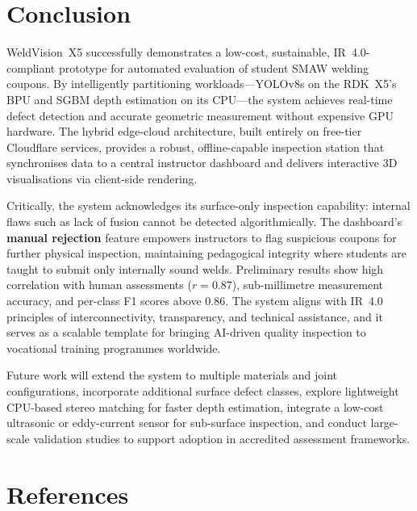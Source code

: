 \documentclass[12pt,a4paper]{article}
\begin{document}
\section{Conclusion}

WeldVision~X5 successfully demonstrates a low-cost, sustainable, IR~4.0-compliant prototype for automated
evaluation of student SMAW welding coupons. By intelligently partitioning workloads---YOLOv8s on the RDK~X5's
BPU and SGBM depth estimation on its CPU---the system achieves real-time defect detection and accurate
geometric measurement without expensive GPU hardware. The hybrid edge-cloud architecture, built entirely on
free-tier Cloudflare services, provides a robust, offline-capable inspection station that synchronises data
to a central instructor dashboard and delivers interactive 3D visualisations via client-side rendering.

Critically, the system acknowledges its surface-only inspection capability: internal flaws such as lack of
fusion cannot be detected algorithmically. The dashboard's \textbf{manual rejection} feature empowers
instructors to flag suspicious coupons for further physical inspection, maintaining pedagogical integrity
where students are taught to submit only internally sound welds. Preliminary results show high correlation
with human assessments ($r = 0.87$), sub-millimetre measurement accuracy, and per-class F1 scores above
0.86. The system aligns with IR~4.0 principles of interconnectivity, transparency, and technical assistance,
and it serves as a scalable template for bringing AI-driven quality inspection to vocational training
programmes worldwide.

Future work will extend the system to multiple materials and joint configurations, incorporate additional
surface defect classes, explore lightweight CPU-based stereo matching for faster depth estimation, integrate a
low-cost ultrasonic or eddy-current sensor for sub-surface inspection, and conduct large-scale validation
studies to support adoption in accredited assessment frameworks.

\section*{References}
\end{document}
